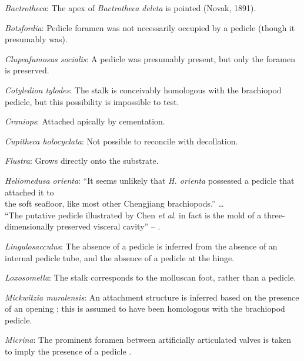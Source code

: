 \documentclass[openany]{book}
\begin{document}
\hypertarget{Bactrotheca-coding-26}{}
\emph{Bactrotheca}: The apex of \emph{Bactrotheca} \emph{deleta} is
pointed (Novak, 1891).

\hypertarget{Botsfordia-coding-26}{}
\emph{Botsfordia}: Pedicle foramen was not necessarily occupied by a
pedicle (though it presumably was).

\hypertarget{Clupeafumosus_socialis-coding-26}{}
\emph{Clupeafumosus socialis}: A pedicle was presumably present, but
only the foramen is preserved.

\hypertarget{Cotyledion_tylodes-coding-26}{}
\emph{Cotyledion tylodes}: The stalk is conceivably homologous with the
brachiopod pedicle, but this possibility is impossible to test.

\hypertarget{Craniops-coding-26}{}
\emph{Craniops}: Attached apically by cementation.

\hypertarget{Cupitheca_holocyclata-coding-26}{}
\emph{Cupitheca holocyclata}: Not possible to reconcile with
decollation.

\hypertarget{Flustra-coding-26}{}
\emph{Flustra}: Grows directly onto the substrate.

\hypertarget{Heliomedusa_orienta-coding-26}{}
\emph{Heliomedusa orienta}: ``It seems unlikely that \emph{H. orienta}
possessed a pedicle that attached it to\\
the soft seafloor, like most other Chengjiang brachiopods.'' \ldots{}\\
``The putative pedicle illustrated by Chen \emph{et al}.
\citeyearpar[Figs 4, 6, 7]{Chen2007Reinterpretationof} in fact is the
mold of a three-dimensionally preserved visceral cavity'' --
\citet{Zhang2009Architectureand}.

\hypertarget{Lingulosacculus-coding-26}{}
\emph{Lingulosacculus}: The absence of a pedicle is inferred from the
absence of an internal pedicle tube, and the absence of a pedicle at the
hinge.

\hypertarget{Loxosomella-coding-26}{}
\emph{Loxosomella}: The stalk corresponds to the molluscan foot, rather
than a pedicle.

\hypertarget{Mickwitzia_muralensis-coding-26}{}
\emph{Mickwitzia muralensis}: An attachment structure is inferred based
on the presence of an opening \citep{Balthasar2004Shellstructure}; this
is assumed to have been homologous with the brachiopod pedicle.

\hypertarget{Micrina-coding-26}{}
\emph{Micrina}: The prominent foramen between artificially articulated
valves is taken to imply the presence of a pedicle
\citep{Holmer2008TheEarly}.
\end{document}
